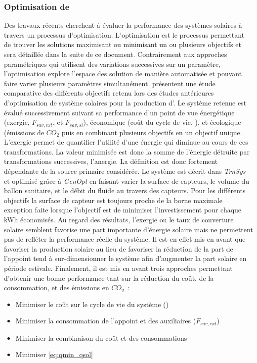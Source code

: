 \subsubsection{Optimisation de } %
\label{ssub:optimisation_de_ssc}
Des travaux récents cherchent à évaluer la performance des systèmes solaires à travers
un processus d’optimisation. L’optimisation est le processus permettant de trouver les
solutions maximisant ou minimisant un ou plusieurs objectifs et sera détaillée dans la
suite de ce document. Contrairement aux approches paramétriques qui utilisent des variations
successives sur un paramètre, l’optimisation explore l’espace des solution de manière automatisée
et pouvant faire varier plusieurs paramètres simultanément. \textcite{Fraisse2009232} présentent
une étude comparative des différents objectifs retenu lors des études antérieures
d’optimisation de système solaires pour la production d’. Le système retenue est
évalué successivement suivant sa performance d’un point de vue énergétique (exergie,
$F_{sav, ext}$, et $F_{sav, si}$), économique (coût du cycle de vie, ), et
écologique (émissions de $CO_{2}$ puis en combinant plusieurs objectifs en un objectif
unique. L’exergie permet de quantifier l’utilité d’une énergie qui diminue au cours de ces transformations. La
valeur minimisée est donc la somme de l’énergie détruite par transformations successives,
l’anergie. La définition est donc fortement dépendante de la source primaire considérée.
Le système est décrit dans \textit{TrnSys} et optimisé grâce à
\textit{GenOpt} en faisant varier la surface de capteurs, le volume du ballon sanitaire,
et le débit du fluide au travers des capteurs. Pour les différents objectifs la surface de
capteur est toujours proche de la borne maximale exception faite lorsque l’objectif est de
minimiser l’investissement pour chaque
\si{kWh} économisés. Au regard des résultats, l’exergie ou le taux de couverture solaire
semblent favorise une part importante d’énergie solaire mais ne permettent pas de refléter
la performance réelle du système. Il est en effet mis en avant que favoriser la production
solaire au lieu de favoriser la réduction de la part de l’appoint tend à sur-dimensionner
le système afin d’augmenter la part solaire en période estivale. Finalement, il est mis en
avant trois approches permettant d’obtenir une  bonne performance tant sur la réduction du
coût, de la consommation, et des émissions en $CO_{2}$~:
\begin{itemize}
    \item Minimiser le coût sur le cycle de vie du système ()
    \item Minimiser la consommation de l’appoint et des auxiliaires ($F_{sav, ext}$)
    \item Minimiser la combinaison du coût et des consommations
    \item Minimiser \eqref{eq:qmin_qsol}
\end{itemize}

